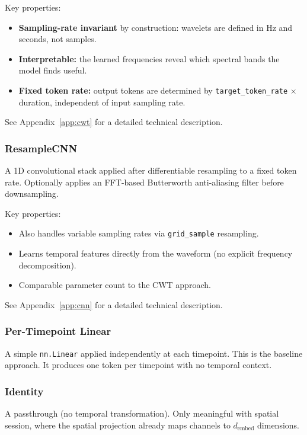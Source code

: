 \documentclass[11pt, a4paper]{article}
\begin{document}
Key properties:
\begin{itemize}[nosep]
      \item \textbf{Sampling-rate invariant} by construction: wavelets are
            defined in Hz and seconds, not samples.
      \item \textbf{Interpretable:} the learned frequencies reveal which
            spectral bands the model finds useful.
      \item \textbf{Fixed token rate:} output tokens are determined by
            \texttt{target\_token\_rate} $\times$ duration, independent of
            input sampling rate.
\end{itemize}

See Appendix~\ref{app:cwt} for a detailed technical description.

\subsubsection{ResampleCNN}
A 1D convolutional stack applied after differentiable resampling to a
fixed token rate. Optionally applies an FFT-based Butterworth anti-aliasing
filter before downsampling.

Key properties:
\begin{itemize}[nosep]
      \item Also handles variable sampling rates via
            \texttt{grid\_sample} resampling.
      \item Learns temporal features directly from the waveform (no
            explicit frequency decomposition).
      \item Comparable parameter count to the CWT approach.
\end{itemize}

See Appendix~\ref{app:cnn} for a detailed technical description.

\subsubsection{Per-Timepoint Linear}
A simple \texttt{nn.Linear} applied independently at each timepoint.
This is the baseline approach. It produces one token per timepoint with
no temporal context.

\subsubsection{Identity}
A passthrough (no temporal transformation). Only meaningful with
spatial session, where the spatial projection already maps channels to
$d_\text{embed}$ dimensions.
\end{document}
